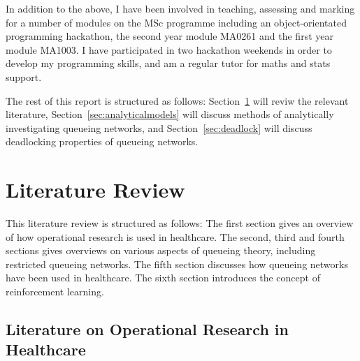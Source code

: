 \documentclass{article}
\begin{document}
In addition to the above, I have been involved in teaching, assessing and
marking for a number of modules on the MSc programme including an object-orientated programming hackathon, the second year module
MA0261 and the first year module MA1003.
I have participated in two hackathon weekends in order to develop my programming skills, and am a regular tutor for maths and stats support.

The rest of this report is structured as follows:
Section~\ref{sec:litreview} will reviw the relevant literature, Section~\ref{sec:analyticalmodels} will discuss methods of analytically investigating queueing networks, and Section~\ref{sec:deadlock} will discuss deadlocking properties of queueing networks.

\section{Literature Review}\label{sec:litreview}

This literature review is structured as follows:
The first section gives an overview of how operational research is used in healthcare.
The second, third and fourth sections gives overviews on various aspects of queueing theory, including restricted queueing networks.
The fifth section discusses how queueing networks have been used in healthcare.
The sixth section introduces the concept of reinforcement learning.

\subsection{Literature on Operational Research in Healthcare}
\end{document}
